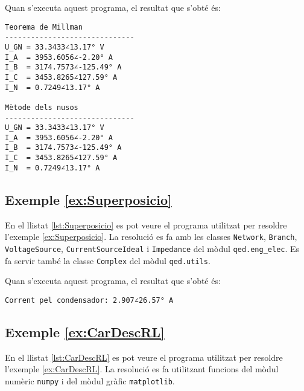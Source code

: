 Quan s'executa aquest programa, el resultat que s'obté és:
\lstset{
	language=,
	numbers=none,
	frame=none
}
\begin{lstlisting}
Teorema de Millman
------------------------------
U_GN = 33.3433∠13.17° V
I_A  = 3953.6056∠-2.20° A
I_B  = 3174.7573∠-125.49° A
I_C  = 3453.8265∠127.59° A
I_N  = 0.7249∠13.17° A

Mètode dels nusos
------------------------------
U_GN = 33.3433∠13.17° V
I_A  = 3953.6056∠-2.20° A
I_B  = 3174.7573∠-125.49° A
I_C  = 3453.8265∠127.59° A
I_N  = 0.7249∠13.17° A
\end{lstlisting} 


\hypertarget{exemple:Superposicio}{\subsection{Exemple \ref*{ex:Superposicio} \Superposicio}}

En el llistat \vref{lst:Superposicio} es pot veure el programa utilitzat per resoldre l'exemple \vref{ex:Superposicio}. La resolució es fa amb les classes \texttt{Network}, \texttt{Branch}, \texttt{VoltageSource}, \texttt{CurrentSourceIdeal} i \texttt{Impedance} del mòdul \texttt{qed.eng\_elec}. Es fa servir també la classe \texttt{Complex} del mòdul \texttt{qed.utils}.


Quan s'executa aquest programa, el resultat que s'obté és:
\lstset{
	language=,
	numbers=none,
	frame=none
}
\begin{lstlisting}
Corrent pel condensador: 2.907∠26.57° A
\end{lstlisting} 


\hypertarget{exemple:CarDescRL}{\subsection{Exemple \ref*{ex:CarDescRL} \CarDescRL}}

En el llistat \vref{lst:CarDescRL} es pot veure el programa utilitzat per resoldre l'exemple \vref{ex:CarDescRL}. La resolució es fa utilitzant funcions del mòdul numèric \texttt{numpy} i del mòdul gràfic  \texttt{matplotlib}.


